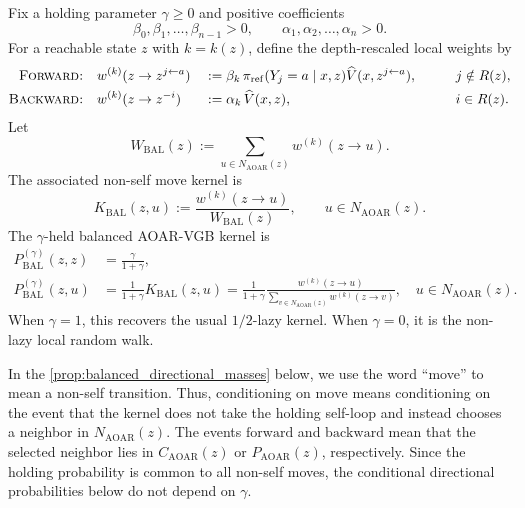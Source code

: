 \documentclass{article}
\numberwithin{theorem}{section}
\numberwithin{proposition}{section}
\numberwithin{corollary}{section}
\numberwithin{lemma}{section}
\numberwithin{conjecture}{section}
\numberwithin{remark}{section}
\numberwithin{definition}{section}
\numberwithin{assumption}{section}
\numberwithin{example}{section}
\providecommand{\base}{\pi_{\mathrm{ref}}}
\begin{document}
\begin{definition}
\label{def:balanced_aoar_weights}
Fix a holding parameter $\gamma\ge 0$ and positive coefficients
\begin{equation*}
    \beta_0,\beta_1,\dots,\beta_{n-1}>0, \qquad \alpha_1,\alpha_2,\dots,\alpha_n>0.
\end{equation*}
For a reachable state $z$ with $k=k(z)$, define the depth-rescaled local weights by
\begin{alignat*}{3}
    \textsc{Forward:}\quad
    & w^{(k)}(z\to z^{j\leftarrow a}) &&:= \beta_k\, \base(Y_j=a\mid x,z)\widehat V(x,z^{j\leftarrow a}), \qquad && j\notin R(z),\\
    \textsc{Backward:}\quad
    & w^{(k)}(z\to z^{-i}) &&:= \alpha_k\, \widehat V(x,z), \qquad && i\in R(z).
\end{alignat*}
Let
\begin{equation*}
    W_{\mathrm{BAL}}(z):=\sum_{u\in N_{\mathrm{AOAR}}(z)} w^{(k)}(z\to u).
\end{equation*}
The associated non-self move kernel is
\begin{equation*}
    K_{\mathrm{BAL}}(z,u) := \frac{w^{(k)}(z\to u)}{W_{\mathrm{BAL}}(z)}, \qquad u\in N_{\mathrm{AOAR}}(z).
\end{equation*}
The $\gamma$-held balanced AOAR-VGB kernel is
\begin{align*}
    P_{\mathrm{BAL}}^{(\gamma)}(z,z) &= \frac{\gamma}{1+\gamma},\\
    P_{\mathrm{BAL}}^{(\gamma)}(z,u)
    &= \frac{1}{1+\gamma}K_{\mathrm{BAL}}(z,u)
    = \frac{1}{1+\gamma}\frac{w^{(k)}(z\to u)}{\sum_{v\in N_{\mathrm{AOAR}}(z)}w^{(k)}(z\to v)},
    \quad u\in N_{\mathrm{AOAR}}(z).
\end{align*}
When $\gamma=1$, this recovers the usual $1/2$-lazy kernel. When $\gamma=0$, it is the non-lazy local random walk.
\end{definition}

In the \cref{prop:balanced_directional_masses} below, we use the word ``move'' to mean a non-self transition. Thus, conditioning on $\mathrm{move}$ means conditioning on the event that the kernel does not take the holding self-loop and instead chooses a neighbor in $N_{\mathrm{AOAR}}(z)$. The events $\mathrm{forward}$ and $\mathrm{backward}$ mean that the selected neighbor lies in $C_{\mathrm{AOAR}}(z)$ or $P_{\mathrm{AOAR}}(z)$, respectively. Since the holding probability is common to all non-self moves, the conditional directional probabilities below do not depend on $\gamma$.
\end{document}
